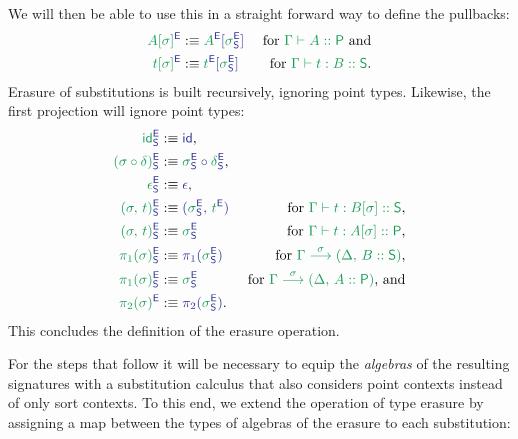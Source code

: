\begin{defn}
We will then be able to use this in a straight forward way to define the pullbacks:
\begin{align*}
\tqm{\grm{A[\sigma]}^\EE}
  &:\equiv \tqm{\grm{A}^\EE[\grm{\sigma}^\EE_\Sc]}
  & \text{ for \grm{\Gamma \vdash A :: \Pc} and} \\
\tqm{\grm{t[\sigma]}^\EE}
  &:\equiv \tqm{\grm{t}^\EE[\grm{\sigma}^\EE_\Sc]}
  & \text{ for \grm{\Gamma \vdash t : B :: \Sc}.}
\end{align*}
Erasure of substitutions is built recursively, ignoring point types.
Likewise, the first projection will ignore point types:
\begin{align*}\label{eq:red-e-sub}
\tqm{\grm{\id}^\EE_\Sc}
  &:\equiv \tqm{\id} \text{,}
  & \\
\tqm{\grm{(\sigma \circ \delta)}^\EE_\Sc}
  &:\equiv \tqm{\grm{\sigma}^\EE_\Sc \circ \grm{\delta}^\EE_\Sc} \text{,}
  & \\
\tqm{\grm{\epsilon}^\EE_\Sc}
  &:\equiv \tqm{\epsilon} \text{,}
  & \\
\tqm{\grm{(\sigma,\, t)}^\EE_\Sc}
  &:\equiv \tqm{(\grm{\sigma}^\EE_\Sc,\, \grm{t}^\EE)}
  & \text{ for \grm{\Gamma \vdash t : B[\sigma] :: \Sc},} \\
\tqm{\grm{(\sigma,\, t)}^\EE_\Sc}
  &:\equiv \tqm{\grm{\sigma}^\EE_\Sc}
  & \text{ for \grm{\Gamma \vdash t : A[\sigma] :: \Pc},} \\
\tqm{\grm{\pi_1(\sigma)}^\EE_\Sc}
  &:\equiv \tqm{\pi_1(\grm{\sigma}^\EE_\Sc)}
  & \text{ for \grm{\IISub{\sigma}{\Gamma}{(\Delta,\, B :: \Sc)}},} \\
\tqm{\grm{\pi_1(\sigma)}^\EE_\Sc}
  &:\equiv \tqm{\grm{\sigma}^\EE_\Sc}
  & \text{ for \grm{\IISub{\sigma}{\Gamma}{(\Delta,\, A :: \Pc)}}, and} \\
\tqm{\grm{\pi_2(\sigma)}^\EE}
  &:\equiv \tqm{\pi_2(\grm{\sigma}^\EE_\Sc)} \text{.}
  &
\end{align*} %
This concludes the definition of the erasure operation.
\end{defn} %

For the steps that follow it will be necessary to equip the \emph{algebras}
of the resulting signatures with a substitution calculus that also considers
point contexts instead of only sort contexts.
To this end, we extend the operation of type erasure by assigning a map between
the types of algebras of the erasure to each substitution:

